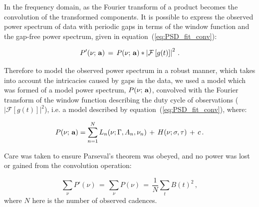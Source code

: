 In the frequency domain, as the Fourier transform of a product becomes the convolution of the transformed components. It is possible to express the observed power spectrum of data with periodic gaps in terms of the window function and the gap-free power spectrum, given in equation~(\ref{eq:PSD_fit_conv}):

\begin{equation}
P'(\nu; \,{\bf a}) \, = \, P(\nu; \,{\bf a}) * \left|\mathcal{F}\left[g(t)\right]\right|^2 \, .
\label{eq:PSD_fit_conv}
\end{equation}

Therefore to model the observed power spectrum in a robust manner, which takes into account the intricacies caused by gaps in the data, we used a model which was formed of a model power spectrum, $P(\nu; \,{\bf a})$, convolved with the Fourier transform of the window function describing the duty cycle of observations ($\left|\mathcal{F}\left[g(t)\right]\right|^2$), i.e. a model described by equation~(\ref{eq:PSD_fit_conv}), where:


\begin{equation}
P(\nu; \,{\bf a}) = \sum_{n=1}^{N} L_n(\nu; \Gamma, A_n, \nu_n) \, + \, H(\nu; \sigma, \tau) \, + \, c \, .
\label{eq:PSD_model}
\end{equation}

Care was taken to ensure Parseval's theorem was obeyed, and no power was lost or gained from the convolution operation: 

\begin{equation}
\sum_{\nu} P'(\nu) \, = \,\sum_{\nu} P(\nu) \, = \, \frac{1}{N} \sum_{t}  B(t)^2 \, ,
\label{eq:parseval}
\end{equation}
%
where $N$ here is the number of observed cadences.





